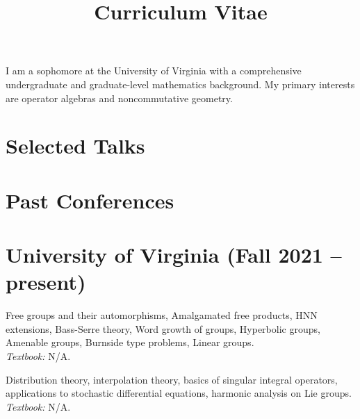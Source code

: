 \documentclass[11pt,letterpaper,sans]{moderncv}
\title{Curriculum Vitae}
\begin{document}
\makecvtitle %
\vspace*{-1.5em}


\begin{center}
  I am a sophomore at the University of Virginia with a comprehensive undergraduate and graduate-level mathematics background. My primary interests are operator algebras and noncommutative geometry.
\end{center}




\section{Selected Talks}



\section{Past Conferences}


  

\section{University of Virginia (Fall 2021 -- present)}

%
   {Free groups and their automorphisms, Amalgamated free products, HNN extensions, Bass-Serre theory, Word growth of groups, Hyperbolic groups, Amenable groups, Burnside type problems, Linear groups. \\ \emph{Textbook: }N/A.}

%
   {Distribution theory, interpolation theory, basics of singular integral operators, applications to stochastic differential equations, harmonic analysis on Lie groups.\\ \emph{Textbook: }N/A.}
\end{document}
